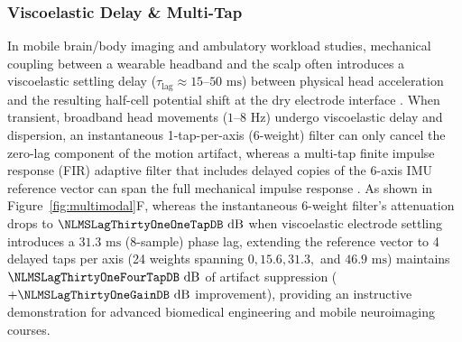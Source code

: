 \documentclass[11pt]{article}
\begin{document}
\subsubsection{Viscoelastic Delay \& Multi-Tap}
In mobile brain/body imaging and ambulatory workload studies, mechanical coupling between a wearable headband and the scalp often introduces a viscoelastic settling delay ($\tau_{\text{lag}} \approx 15\text{--}50\text{ ms}$) between physical head acceleration and the resulting half-cell potential shift at the dry electrode interface \citep{rosanne2021adaptive,klug2022bemobil}. When transient, broadband head movements ($1\text{--}8\text{ Hz}$) undergo viscoelastic delay and dispersion, an instantaneous 1-tap-per-axis (6-weight) filter can only cancel the zero-lag component of the motion artifact, whereas a multi-tap finite impulse response (FIR) adaptive filter that includes delayed copies of the 6-axis IMU reference vector can span the full mechanical impulse response \citep{widrow1975adaptive,rosanne2021adaptive}. As shown in Figure~\ref{fig:multimodal}F, whereas the instantaneous 6-weight filter's attenuation drops to $\NLMSLagThirtyOneOneTapDB\text{ dB}$ when viscoelastic electrode settling introduces a $31.3\text{ ms}$ (8-sample) phase lag, extending the reference vector to 4 delayed taps per axis (24 weights spanning $0, 15.6, 31.3,$ and $46.9\text{ ms}$) maintains $\NLMSLagThirtyOneFourTapDB\text{ dB}$ of artifact suppression ($+\NLMSLagThirtyOneGainDB\text{ dB}$ improvement), providing an instructive demonstration for advanced biomedical engineering and mobile neuroimaging courses.
\end{document}
